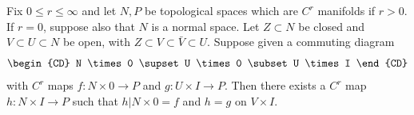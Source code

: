 Fix $0 \leqslant r \leqslant \infty$ and let $N, P$ be topological spaces which are $C^r$ manifolds if $r > 0$. If $r = 0$, suppose also that $N$ is a normal space. Let $Z \subset N$ be closed and $V \subset U \subset N$ be open, with $Z \subset V \subset \bar{V} \subset U$. Suppose given a commuting diagram
\[
\begin{CD}
N \times 0 \supset U \times 0 \subset U \times I
\end{CD}
\]
with $C^r$ maps $f: N \times 0 \to P$ and $g: U \times I \to P$. Then there exists a $C^r$ map $h: N \times I \to P$ such that $h|N \times 0 = f$ and $h = g$ on $V \times I$.

